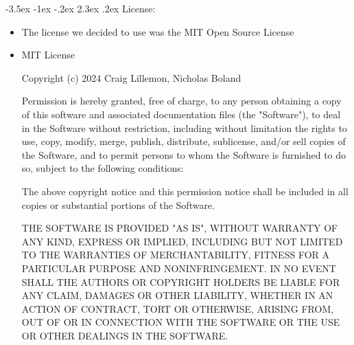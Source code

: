 \documentclass[11pt]{article}
\makeatletter
\renewcommand\section{\@startsection{section}{1}{\z@}%
                                  {-3.5ex \@plus -1ex \@minus -.2ex}%
                                  {2.3ex \@plus.2ex}%
                                  {\normalfont\large\bfseries}}
\renewcommand\section{\@startsection{section}{1}{\z@}%
                                  {-3.5ex \@plus -1ex \@minus -.2ex}%
                                  {2.3ex \@plus.2ex}%
                                  {\normalfont\large\bfseries}}
\makeatother
\begin{document}
\section{License:}
    \begin{itemize}
        \item The license we decided to use was the MIT Open Source License
        \item MIT License

Copyright (c) 2024 Craig Lillemon, Nicholas Boland

Permission is hereby granted, free of charge, to any person obtaining a copy
of this software and associated documentation files (the "Software"), to deal
in the Software without restriction, including without limitation the rights
to use, copy, modify, merge, publish, distribute, sublicense, and/or sell
copies of the Software, and to permit persons to whom the Software is
furnished to do so, subject to the following conditions:

The above copyright notice and this permission notice shall be included in all
copies or substantial portions of the Software.

THE SOFTWARE IS PROVIDED "AS IS", WITHOUT WARRANTY OF ANY KIND, EXPRESS OR
IMPLIED, INCLUDING BUT NOT LIMITED TO THE WARRANTIES OF MERCHANTABILITY,
FITNESS FOR A PARTICULAR PURPOSE AND NONINFRINGEMENT. IN NO EVENT SHALL THE
AUTHORS OR COPYRIGHT HOLDERS BE LIABLE FOR ANY CLAIM, DAMAGES OR OTHER
LIABILITY, WHETHER IN AN ACTION OF CONTRACT, TORT OR OTHERWISE, ARISING FROM,
OUT OF OR IN CONNECTION WITH THE SOFTWARE OR THE USE OR OTHER DEALINGS IN THE
SOFTWARE.
    \end{itemize}
\end{document}
